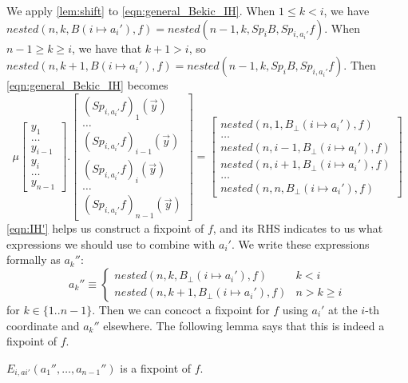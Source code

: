 We apply \autoref{lem:shift} to \autoref{eqn:general_Bekic_IH}. When $1\leq k<i$, we have $nested(n,k,B(i\mapsto a_i'), f) = nested(n-1,k,Sp_iB,Sp_{i,a_i'}f)$. When $n-1\geq k\geq i$, we have that $k+1>i$, so $nested(n,k+1,B(i\mapsto a_i'), f) = nested(n-1,k,Sp_iB,Sp_{i,a_i'}f)$. Then \autoref{eqn:general_Bekic_IH} becomes
\begin{equation}
    \label{eqn:IH'}
    \mu \begin{bmatrix}
    y_1 \\ \dots \\  y_{i-1}\\y_i \\ \dots \\ y_{n-1}
\end{bmatrix}. \begin{bmatrix}
    (Sp_{i,a_i'}f)_1(\vec{y}) \\ \dots \\ (Sp_{i,a_i'}f)_{i-1}(\vec{y}) \\ (Sp_{i,a_i'}f)_{i}(\vec{y}) \\ \dots \\ (Sp_{i,a_i'}f)_{n-1}(\vec{y})
\end{bmatrix} = \begin{bmatrix}
    nested(n,1,B_\bot(i\mapsto a_i'),f) \\ \dots \\ nested(n,i-1,B_\bot(i\mapsto a_i'), f) \\ nested(n,i+1,B_\bot(i\mapsto a_i'), f) \\ \dots \\  nested(n,n,B_\bot(i\mapsto a_i'),f)
\end{bmatrix}
\end{equation}
\autoref{eqn:IH'} helps us construct a fixpoint of $f$, and its RHS indicates to us what expressions we should use to combine with $a_i'$. We write these expressions formally as $a_k''$:
\begin{equation}
    \label{eqn:ak''}
a_k'' \equiv \begin{cases}
    nested(n,k,B_\bot(i\mapsto a_i'),f) & k<i \\
    nested(n,k+1,B_\bot(i\mapsto a_i'),f) & n > k\geq i
\end{cases}
\end{equation}
for $k\in \{1..n-1\}$. Then we can concoct a fixpoint for $f$ using $a_i'$ at the $i$-th coordinate and $a_k''$ elsewhere. The following lemma says that this is indeed a fixpoint of $f$.
\begin{lemma}
    \label{lem:ai_le_ai'}
    $E_{i,ai'}(a_1'',\dots,a_{n-1}'')$ is a fixpoint of $f$.
\end{lemma}
